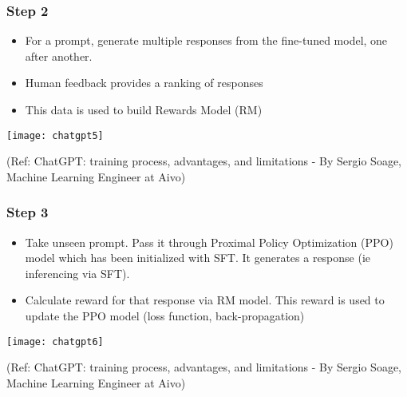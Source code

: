 \begin{frame}[fragile]\frametitle{Step 2}

\begin{itemize}
\item For a prompt, generate multiple responses from the fine-tuned model, one after another.
\item Human feedback provides a ranking of responses
\item This data is used to build Rewards Model (RM)
\end{itemize}	 

			\begin{center}
			\texttt{[image: chatgpt5]}
			
			\end{center}		
			
			{\tiny (Ref: ChatGPT: training process, advantages, and limitations - By Sergio Soage, Machine Learning Engineer at Aivo)}
			
\end{frame}




			
			
			


\begin{frame}[fragile]\frametitle{Step 3}

\begin{itemize}
\item Take unseen prompt. Pass it through Proximal Policy Optimization (PPO) model which has been initialized with SFT. It generates a response (ie inferencing via SFT).
\item Calculate reward for that response via RM model. This reward is used to update the PPO model (loss function, back-propagation)
\end{itemize}	 

			\begin{center}
			\texttt{[image: chatgpt6]}
			
			\end{center}		
			
			{\tiny (Ref: ChatGPT: training process, advantages, and limitations - By Sergio Soage, Machine Learning Engineer at Aivo)}
			
\end{frame}

